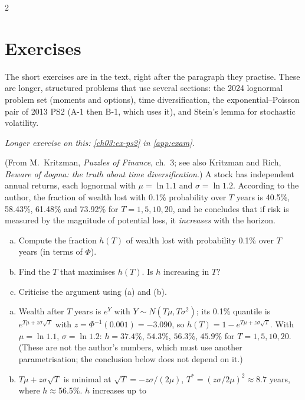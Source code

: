 \begin{paracol}{2}
\section*{Exercises}
\label{ch03:sec-exercises}
The short exercises are in the text, right after the paragraph they practise. These are longer, structured
problems that use several sections: the 2024 lognormal problem set (moments and options), time
diversification, the exponential--Poisson pair of 2013 PS2 (A-1 then B-1, which uses it), and Stein's lemma
for stochastic volatility.

\noindent\emph{Longer exercise on this: \cref{ch03:ex-ps2} in \cref{app:exam}.}

\begin{exercise}\label{ch03:ex-timediv}
(From M.~Kritzman, \emph{Puzzles of Finance}, ch.~3; see also Kritzman and Rich, \emph{Beware of dogma: the truth
about time diversification}.) A stock has independent annual returns, each lognormal with $\mu=\ln1.1$ and
$\sigma=\ln1.2$. According to the author, the fraction of wealth lost with 0.1\% probability over $T$ years is
40.5\%, 58.43\%, 61.48\% and 73.92\% for $T=1,5,10,20$, and he concludes that if risk is measured by the
magnitude of potential loss, it \emph{increases} with the horizon.
\begin{enumerate}[(a)]
  \item Compute the fraction $h(T)$ of wealth
      lost with probability 0.1\% over $T$ years (in terms of $\Phi$).
  \item Find the $T$ that maximises $h(T)$. Is $h$
      increasing in $T$?
  \item Criticise the argument using (a) and (b).
\end{enumerate}
\end{exercise}
\begin{solution}[ch03:ex-timediv]
\begin{enumerate}[(a)]
  \item Wealth after $T$ years is $e^{Y}$ with $Y\sim N(T\mu,T\sigma^2)$; its 0.1\% quantile is $e^{T\mu+z\sigma\sqrt T}$ with $z=\Phi^{-1}(0.001)=-3.090$,
        so $h(T)=1-e^{T\mu+z\sigma\sqrt T}$. With $\mu=\ln1.1$, $\sigma=\ln1.2$: $h=37.4\%$, $54.3\%$, $56.3\%$, $45.9\%$ for $T=1,5,10,20$.
        (These are not the author's numbers, which must use another parametrisation; the conclusion below does not depend on it.)
  \item $T\mu+z\sigma\sqrt T$ is minimal at $\sqrt T=-z\sigma/(2\mu)$, $T^*=(z\sigma/2\mu)^2\approx8.7$ years, where $h\approx56.5\%$. $h$ increases up to

\end{enumerate}
\end{solution}
\end{paracol}
